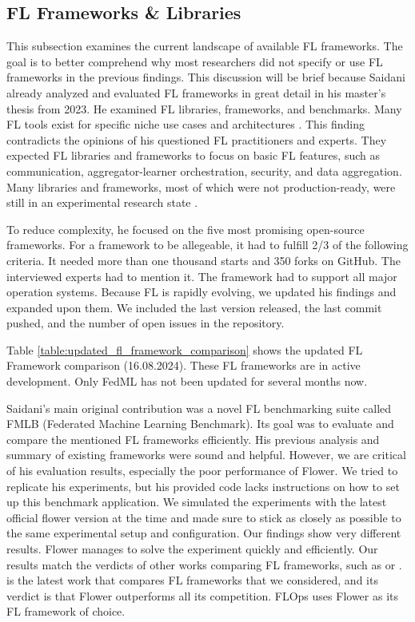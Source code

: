 \subsection{FL Frameworks \& Libraries}\label{subsection:fl_frameworks_and_libraries}

This subsection examines the current landscape of available FL frameworks.
The goal is to better comprehend why most researchers did not specify or use FL frameworks in the previous findings.
This discussion will be brief because Saidani already analyzed and evaluated FL frameworks in great detail in his master's thesis \cite{thesis:tum_fl_framework_comparison} from 2023.
He examined FL libraries, frameworks, and benchmarks.
Many FL tools exist for specific niche use cases and architectures \cite{thesis:tum_fl_framework_comparison}.
This finding contradicts the opinions of his questioned FL practitioners and experts.
They expected FL libraries and frameworks to focus on basic FL features, such as communication, aggregator-learner orchestration, security, and data aggregation.
Many libraries and frameworks, most of which were not production-ready, were still in an experimental research state \cite{thesis:tum_fl_framework_comparison}.

To reduce complexity, he focused on the five most promising open-source frameworks.
For a framework to be allegeable, it had to fulfill 2/3 of the following criteria.
It needed more than one thousand starts and 350 forks on GitHub.
The interviewed experts had to mention it.
The framework had to support all major operation systems.
Because FL is rapidly evolving, we updated his findings and expanded upon them.
We included the last version released, the last commit pushed, and the number of open issues in the repository.

Table \ref{table:updated_fl_framework_comparison} shows the updated FL Framework comparison (16.08.2024).
These FL frameworks are in active development. 
Only FedML has not been updated for several months now.

Saidani's main original contribution was a novel FL benchmarking suite called FMLB (Federated Machine Learning Benchmark).
Its goal was to evaluate and compare the mentioned FL frameworks efficiently.
His previous analysis and summary of existing frameworks were sound and helpful.
However, we are critical of his evaluation results, especially the poor performance of Flower.
We tried to replicate his experiments, but his provided code \cite{tum_fl_framework_thesis_github} lacks instructions on how to set up this benchmark application.
We simulated the experiments with the latest official flower version at the time and made sure to stick as closely as possible to the same experimental setup and configuration.
Our findings show very different results.
Flower manages to solve the experiment quickly and efficiently.
Our results match the verdicts of other works comparing FL frameworks, such as \cite{comparative_analysis_of_fl_frameworks} or \cite{comprehensive_study_fl_frameworks_degree_project}.
\cite{comparative_analysis_of_fl_frameworks} is the latest work that compares FL frameworks that we considered, and its verdict is that Flower outperforms all its competition.
FLOps uses Flower as its FL framework of choice.